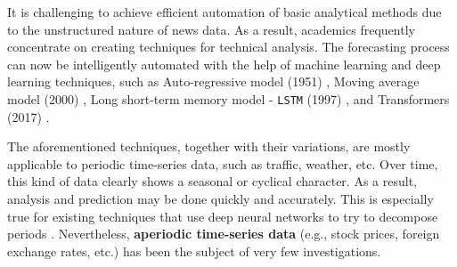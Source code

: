 
It is challenging to achieve efficient automation of basic analytical methods due to the unstructured nature of news data. As a result, academics frequently concentrate on creating techniques for technical analysis. The forecasting process can now be intelligently automated with the help of machine learning and deep learning techniques, such as Auto-regressive model (1951) \cite{moran1951hypothesis}, Moving average model (2000) \cite{rosenblatt2000gaussian}, Long short-term memory model - \verb|LSTM| (1997) \cite{hochreiter1997long}, and Transformers (2017) \cite{vaswani2017attention}.


The aforementioned techniques, together with their variations, are mostly applicable to periodic time-series data, such as traffic, weather, etc. Over time, this kind of data clearly shows a seasonal or cyclical character. As a result, analysis and prediction may be done quickly and accurately. This is especially true for existing techniques that use deep neural networks to try to decompose periods \cite{liu2022scinet,chen2021autoformer,zhou2022fedformer}. Nevertheless, \textbf{aperiodic time-series data} (e.g., stock prices, foreign exchange rates, etc.) has been the subject of very few investigations.

